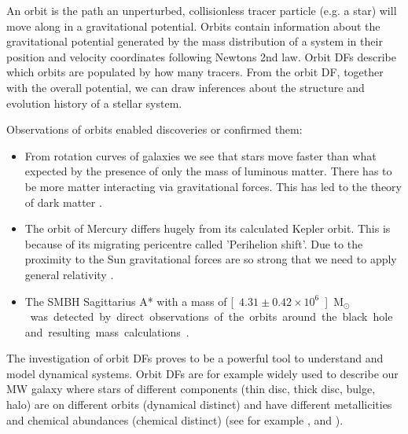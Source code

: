 \par An orbit is the path an unperturbed, collisionless tracer particle (e.g. a star) will move along in a gravitational potential. Orbits contain information about the gravitational potential generated by the mass distribution of a system in their position and velocity coordinates following Newtons 2nd law. Orbit \acp{DF} describe which orbits are populated by how many tracers. From the orbit \ac{DF}, together with the overall potential, we can draw inferences about the structure and evolution history of a stellar system. 
\par Observations of orbits enabled discoveries or confirmed them: 
\begin{itemize}
\item From rotation curves of galaxies we see that stars move faster than what expected by the presence of only the mass of luminous matter. There has to be more matter interacting via gravitational forces. This has led to the theory of dark matter \citep{1980ApJ...238..471R}.
\item The orbit of Mercury differs hugely from its calculated Kepler orbit. This is because of its migrating pericentre called 'Perihelion shift'. Due to the proximity to the Sun gravitational forces are so strong that we need to apply general relativity \citep[p.609/610]{2006ima..book.....C}.
\item The \ac{SMBH} Sagittarius A*  with a mass of \unit[\(4.31\pm0.42\times 10^6\)]{M\(_\odot\)} was detected by direct observations of the orbits around the black hole and resulting mass calculations \citep{2009ApJ...692.1075G}. 
\end{itemize}
\par The investigation of orbit \acp{DF} proves to be a powerful tool to understand and model dynamical systems. Orbit \acp{DF} are for example widely used to describe our \ac{MW} galaxy where stars of different components (thin disc, thick disc, bulge, halo) are on different orbits (dynamical distinct) and have different metallicities and chemical abundances (chemical distinct) (see for example \citealt{2013ApJ...779..115B}, \citealt{2014MNRAS.445.3133P} and \citealt{2015MNRAS.449.3479S}).
